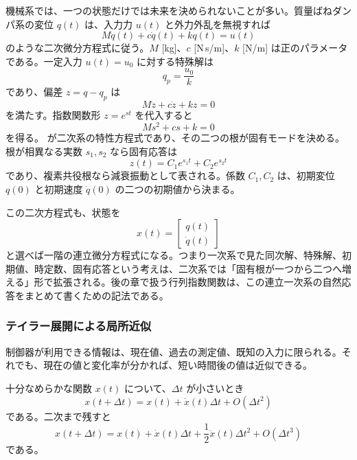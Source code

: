 機械系では、一つの状態だけでは未来を決められないことが多い。質量ばねダンパ系の変位 $q(t)$ は、入力力 $u(t)$ と外力外乱を無視すれば
\begin{equation}
  M\ddot{q}(t)+c\dot{q}(t)+kq(t)=u(t)
  \label{eq:second-order-ode-connection}
\end{equation}
のような二次微分方程式に従う。$M$ [kg]、$c$ [N\,s/m]、$k$ [N/m] は正のパラメータである。一定入力 $u(t)=u_0$ に対する特殊解は
\begin{equation}
  q_p=\frac{u_0}{k}
\end{equation}
であり、偏差 $z=q-q_p$ は
\begin{equation}
  M\ddot{z}+c\dot{z}+kz=0
\end{equation}
を満たす。指数関数形 $z=e^{st}$ を代入すると
\begin{equation}
  Ms^2+cs+k=0
  \label{eq:mass-spring-characteristic}
\end{equation}
を得る。 が二次系の特性方程式であり、その二つの根が固有モードを決める。根が相異なる実数 $s_1,s_2$ なら固有応答は
\begin{equation}
  z(t)=C_1e^{s_1t}+C_2e^{s_2t}
\end{equation}
であり、複素共役根なら減衰振動として表される。係数 $C_1,C_2$ は、初期変位 $q(0)$ と初期速度 $\dot{q}(0)$ の二つの初期値から決まる。

この二次方程式も、状態を
\begin{equation}
  x(t)=\begin{bmatrix}q(t)\\ \dot{q}(t)\end{bmatrix}
\end{equation}
と選べば一階の連立微分方程式になる。つまり一次系で見た同次解、特殊解、初期値、時定数、固有応答という考えは、二次系では「固有根が一つから二つへ増える」形で拡張される。後の章で扱う行列指数関数は、この連立一次系の自然応答をまとめて書くための記法である。

\subsubsection{テイラー展開による局所近似}

制御器が利用できる情報は、現在値、過去の測定値、既知の入力に限られる。それでも、現在の値と変化率が分かれば、短い時間後の値は近似できる。

\begin{theorem}[テイラーの定理の一次近似]
十分なめらかな関数 $x(t)$ について、$\Delta t$ が小さいとき
\begin{equation}
  x(t+\Delta t)=x(t)+\dot{x}(t)\Delta t+O(\Delta t^2)
\end{equation}
である。二次まで残すと
\begin{equation}
  x(t+\Delta t)=x(t)+\dot{x}(t)\Delta t+
  \frac{1}{2}\ddot{x}(t)\Delta t^2+O(\Delta t^3)
\end{equation}
である。
\end{theorem}


